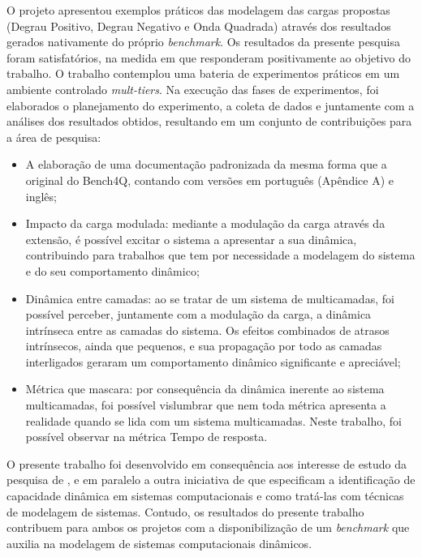 O projeto apresentou exemplos práticos das modelagem das cargas propostas (Degrau Positivo, Degrau Negativo e Onda Quadrada) através dos resultados gerados nativamente do próprio \textit{benchmark}. Os resultados da presente pesquisa foram satisfatórios, na medida em que responderam positivamente ao objetivo do trabalho. O trabalho contemplou uma bateria de experimentos práticos em um ambiente controlado \textit{mult-tiers}. Na execução das fases de experimentos, foi elaborados o planejamento do experimento, a coleta de dados e juntamente com a análises dos resultados obtidos, resultando em um conjunto de contribuições para a área de pesquisa:
\begin{itemize}
	\item A elaboração de uma documentação padronizada da mesma forma que a original do Bench4Q, contando com versões em português (Apêndice A) e inglês;
	
	\item Impacto da carga modulada: mediante a modulação da carga através da extensão, é possível excitar o sistema a apresentar a sua dinâmica, contribuindo para trabalhos que tem por necessidade a modelagem do sistema e do seu comportamento dinâmico;
	
	\item Dinâmica entre camadas: ao se tratar de um sistema de multicamadas, foi possível perceber, juntamente com a modulação da carga, a dinâmica intrínseca entre as camadas do sistema. Os efeitos combinados de atrasos intrínsecos, ainda que pequenos, e sua propagação por todo as camadas interligados geraram um comportamento dinâmico significante e apreciável;
	
	\item Métrica que mascara: por consequência da dinâmica inerente ao sistema multicamadas, foi possível vislumbrar que nem toda métrica apresenta a realidade quando se lida com um sistema multicamadas. Neste trabalho, foi possível observar na métrica Tempo de resposta.
\end{itemize} 

O presente trabalho foi desenvolvido em consequência aos interesse de estudo da pesquisa de , e em paralelo a outra iniciativa de  que especificam a identificação de capacidade dinâmica em sistemas computacionais e como tratá-las com técnicas de modelagem de sistemas. Contudo, os resultados do presente trabalho contribuem para ambos os projetos com a disponibilização de um \textit{benchmark} que auxilia na modelagem de sistemas computacionais dinâmicos.

